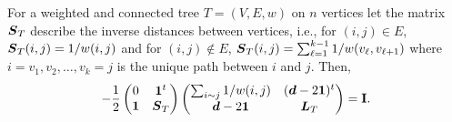 \begin{lemma}
	\label{lem:block_matrix_tree}
 For a weighted and connected tree $T=(V,E,w)$ on $n$ vertices let the matrix $\vb*{S}_T$ describe the inverse distances  between vertices, i.e., for $(i,j)\in E$, $\vb*{S}_T(i,j) = 1/w(i,j)$ and for $(i,j)\notin E$, $\vb*{S}_T(i,j) = \sum_{\ell=1}^{k-1} 1/w(v_\ell,v_{\ell+1})$ where $i=v_1,v_2,\dots,v_k=j$ is the unique path between $i$ and $j$. Then,
 \begin{equation}
 \label{eq:block_ST}
-\frac{1}{2} \begin{pmatrix}
0 & \vb{1}^t \\
\vb{1} & \vb*{S}_T 
\end{pmatrix}
\begin{pmatrix}
\sum_{i\sim j}1/w(i,j)  & (\vb*{d}-2\vb{1})^t \\
\vb*{d}-2\vb{1} & \vb*{L}_T
\end{pmatrix} = \vb{I}.
 \end{equation}
\end{lemma}
